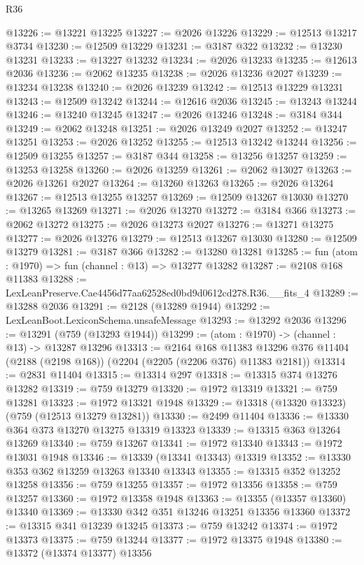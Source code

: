 \begin{lexlean}{R36}
\begin{coremodule}
@13226 := @13221 @13225
@13227 := @2026 @13226
@13229 := @12513 @13217 @3734
@13230 := @12509 @13229
@13231 := @3187 @322
@13232 := @13230 @13231
@13233 := @13227 @13232
@13234 := @2026 @13233
@13235 := @12613 @2036
@13236 := @2062 @13235
@13238 := @2026 @13236 @2027
@13239 := @13234 @13238
@13240 := @2026 @13239
@13242 := @12513 @13229 @13231
@13243 := @12509 @13242
@13244 := @12616 @2036
@13245 := @13243 @13244
@13246 := @13240 @13245
@13247 := @2026 @13246
@13248 := @3184 @344
@13249 := @2062 @13248
@13251 := @2026 @13249 @2027
@13252 := @13247 @13251
@13253 := @2026 @13252
@13255 := @12513 @13242 @13244
@13256 := @12509 @13255
@13257 := @3187 @344
@13258 := @13256 @13257
@13259 := @13253 @13258
@13260 := @2026 @13259
@13261 := @2062 @13027
@13263 := @2026 @13261 @2027
@13264 := @13260 @13263
@13265 := @2026 @13264
@13267 := @12513 @13255 @13257
@13269 := @12509 @13267 @13030
@13270 := @13265 @13269
@13271 := @2026 @13270
@13272 := @3184 @366
@13273 := @2062 @13272
@13275 := @2026 @13273 @2027
@13276 := @13271 @13275
@13277 := @2026 @13276
@13279 := @12513 @13267 @13030
@13280 := @12509 @13279
@13281 := @3187 @366
@13282 := @13280 @13281
@13285 := fun (atom : @1970) => fun (channel : @13) => @13277 @13282
@13287 := @2108 @168 @11383
@13288 := LexLeanPreserve.Cae4456d77aa62528ed0bd9d0612cd278.R36.__fits_4
@13289 := @13288 @2036
@13291 := @2128 (@13289 @1944)
@13292 := LexLeanBoot.LexiconSchema.unsafeMessage
@13293 := @13292 @2036
@13296 := @13291 (@759 (@13293 @1944))
@13299 := (atom : @1970) -> (channel : @13) -> @13287 @13296
@13313 := @2164
    @168
    @11383
    @13296
    @376
    @11404
    (@2188 (@2198 @168))
    (@2204 (@2205 (@2206 @376) @11383 @2181))
@13314 := @2831 @11404
@13315 := @13314 @297
@13318 := @13315 @374 @13276 @13282
@13319 := @759 @13279
@13320 := @1972 @13319
@13321 := @759 @13281
@13323 := @1972 @13321 @1948
@13329 := @13318 (@13320 @13323) (@759 (@12513 @13279 @13281))
@13330 := @2499 @11404
@13336 := @13330 @364 @373 @13270 @13275 @13319 @13323
@13339 := @13315 @363 @13264 @13269
@13340 := @759 @13267
@13341 := @1972 @13340
@13343 := @1972 @13031 @1948
@13346 := @13339 (@13341 @13343) @13319
@13352 := @13330 @353 @362 @13259 @13263 @13340 @13343
@13355 := @13315 @352 @13252 @13258
@13356 := @759 @13255
@13357 := @1972 @13356
@13358 := @759 @13257
@13360 := @1972 @13358 @1948
@13363 := @13355 (@13357 @13360) @13340
@13369 := @13330 @342 @351 @13246 @13251 @13356 @13360
@13372 := @13315 @341 @13239 @13245
@13373 := @759 @13242
@13374 := @1972 @13373
@13375 := @759 @13244
@13377 := @1972 @13375 @1948
@13380 := @13372 (@13374 @13377) @13356

\end{coremodule}
\end{lexlean}
